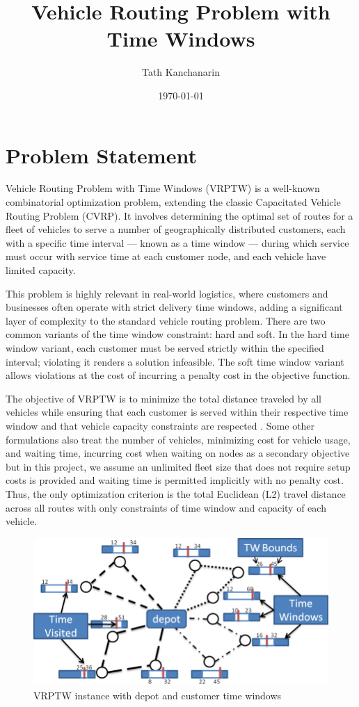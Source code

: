\documentclass[twocolumn, 10pt]{article}
\title{Vehicle Routing Problem with Time Windows}
\author{Tath Kanchanarin}
\date{\today}
\begin{document}
\maketitle


\section*{Problem Statement}
Vehicle Routing Problem with Time Windows (VRPTW) is a well-known
 combinatorial optimization problem, 
 extending the classic Capacitated Vehicle Routing Problem (CVRP).
  It involves determining the optimal set of routes for a fleet
   of vehicles to serve a number of geographically distributed customers,
    each with a specific time interval — known as a time window — during which service must occur with service time at each customer node,
    and each vehicle have limited capacity.

This problem is highly relevant in real-world logistics, where customers and businesses often operate with strict delivery time windows, adding a significant layer of complexity to the standard vehicle routing problem.
There are two common variants of the time window constraint: hard and soft. In the hard time window variant, each customer must be served strictly within the specified interval; violating it renders a solution infeasible. The soft time window variant allows violations at the cost of incurring a penalty cost in the objective function.


The objective of VRPTW is to minimize the total distance traveled by all vehicles while ensuring that each customer is served within their respective time window
 and that vehicle capacity constraints are respected
 . Some other formulations also treat the number of vehicles, minimizing cost for vehicle usage, and waiting time, incurring cost when waiting on nodes as a secondary objective but in this project, we assume an unlimited fleet size that does not require setup costs is provided and waiting time is permitted implicitly with no penalty cost.
 Thus, the only optimization criterion is the total Euclidean (L2) travel distance across all routes with only constraints of time window and capacity of each vehicle.
\begin{figure}[htbp]
    \centering
    \includegraphics[width=\linewidth]{figures/figures.png}
    \caption{ VRPTW instance with depot and customer time windows \cite{fig_cvrptw}}
    \label{fig:problem_statement}
\end{figure}
\end{document}
